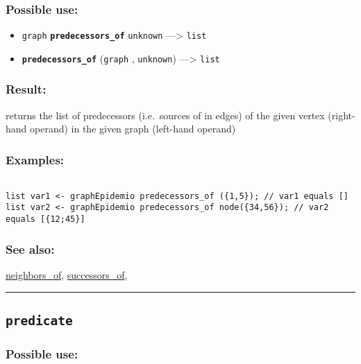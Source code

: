 \documentclass[]{book}
\providecommand{\tightlist}{%
  \setlength{\itemsep}{0pt}\setlength{\parskip}{0pt}}
\theoremstyle{definition}
\theoremstyle{definition}
\theoremstyle{definition}
\theoremstyle{remark}
\begin{document}
\subsubsection{Possible use:}\label{possible-use-415}

\begin{itemize}
\tightlist
\item
  \texttt{graph} \textbf{\texttt{predecessors\_of}} \texttt{unknown}
  ---\textgreater{} \texttt{list}
\item
  \textbf{\texttt{predecessors\_of}} (\texttt{graph} , \texttt{unknown})
  ---\textgreater{} \texttt{list}
\end{itemize}

\subsubsection{Result:}\label{result-401}

returns the list of predecessors (i.e.~sources of in edges) of the given
vertex (right-hand operand) in the given graph (left-hand operand)

\subsubsection{Examples:}\label{examples-289}

\begin{verbatim}
 
list var1 <- graphEpidemio predecessors_of ({1,5}); // var1 equals [] 
list var2 <- graphEpidemio predecessors_of node({34,56}); // var2 equals [{12;45}]
\end{verbatim}

\subsubsection{See also:}\label{see-also-168}

\href{OperatorsNR\#neighbors_of}{neighbors\_of},
\href{OperatorsSZ\#successors_of}{successors\_of},

\begin{center}\rule{0.5\linewidth}{\linethickness}\end{center}

\subsection{\texorpdfstring{\texttt{predicate}}{predicate}}\label{predicate}

\subsubsection{Possible use:}\label{possible-use-416}
\end{document}

